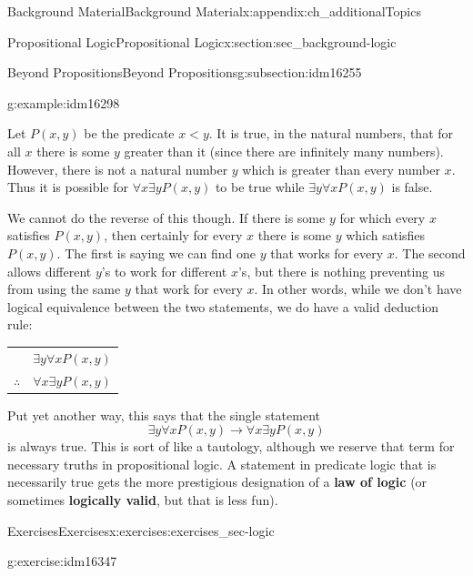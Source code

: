 \documentclass[oneside,10pt,]{book}
\newcommand{\terminology}[1]{\textbf{#1}}
\numberwithin{equation}{chapter}
\newcommand{\hrulethin}  {\noalign{\hrule height 0.04em}}
\def\imp{\rightarrow}
\newcommand{\lt}{<}
\begin{document}
\begin{appendixptx}{Background Material}{}{Background Material}{}{}{x:appendix:ch_additionalTopics}
\begin{sectionptx}{Propositional Logic}{}{Propositional Logic}{}{}{x:section:sec_background-logic}
\begin{subsectionptx}{Beyond Propositions}{}{Beyond Propositions}{}{}{g:subsection:idm16255}
\begin{example}{}{g:example:idm16298}
\par
Let \(P(x,y)\) be the predicate \(x \lt  y\). It is true, in the natural numbers, that for all \(x\) there is some \(y\) greater than it (since there are infinitely many numbers). However, there is not a natural number \(y\) which is greater than every number \(x\).  Thus it is possible for \(\forall x \exists y P(x,y)\) to be true while \(\exists y \forall x P(x,y)\) is false.%
\par
We cannot do the reverse of this though. If there is some \(y\) for which every \(x\) satisfies \(P(x,y)\), then certainly for every \(x\) there is some \(y\) which satisfies \(P(x,y)\). The first is saying we can find one \(y\) that works for every \(x\). The second allows different \(y\)'s to work for different \(x\)'s, but there is nothing preventing us from using the same \(y\) that work for every \(x\).  In other words, while we don't have logical equivalence between the two statements, we do have a valid deduction rule:%
\begin{sidebyside}{1}{0}{0}{0}%
\begin{sbspanel}{1}%
{\centering%
\begin{tabular}{cc}
&\(\exists y \forall x P(x,y)\)\tabularnewline\hrulethin
\(\therefore\)&\(\forall x \exists y P(x,y)\)
\end{tabular}
\par}
\end{sbspanel}%
\end{sidebyside}%
\par
Put yet another way, this says that the single statement%
\begin{equation*}
\exists y \forall x P(x,y) \imp \forall x \exists y P(x,y)
\end{equation*}
is always true.  This is sort of like a tautology, although we reserve that term for necessary truths in propositional logic.  A statement in predicate logic that is necessarily true gets the more prestigious designation of a \terminology{law of logic} (or sometimes \terminology{logically valid}, but that is less fun).%
\end{example}
\end{subsectionptx}
%
%
\typeout{************************************************}
\typeout{************************************************}
%
\begin{exercises-subsection}{Exercises}{}{Exercises}{}{}{x:exercises:exercises_sec-logic}
\begin{divisionexercise}{1}{}{}{g:exercise:idm16347}%

\end{divisionexercise}
\end{exercises-subsection}
\end{sectionptx}
\end{appendixptx}
\end{document}
